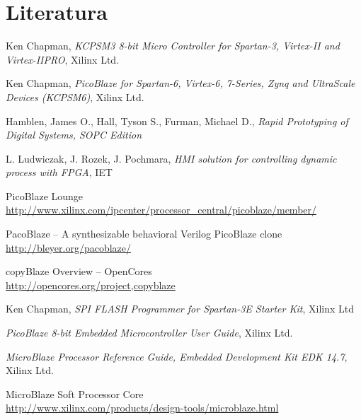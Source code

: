 

\rozdzial

\renewcommand*{\refname}{\vspace*{-1.5cm}}




\section{Literatura} 

\begin{thebibliography}{1}
	
 Ken Chapman,
	\textit{KCPSM3 8-bit Micro Controller for Spartan-3, Virtex-II and \mbox{Virtex-IIPRO}},
	Xilinx Ltd.
	
 Ken Chapman,
	\textit{PicoBlaze for Spartan-6, Virtex-6, 7-Series, Zynq and UltraScale Devices (KCPSM6)},
	Xilinx Ltd.

 Hamblen, James O., Hall, Tyson S., Furman, Michael D.,
	\textit{Rapid Prototyping of Digital Systems, SOPC Edition}


  L. Ludwiczak, J. Rozek, J. Pochmara,
	\textit{HMI solution for controlling dynamic process with FPGA},
	IET

 PicoBlaze Lounge \\
	\url{http://www.xilinx.com/ipcenter/processor\_central/picoblaze/member/}

 PacoBlaze -- A synthesizable behavioral Verilog PicoBlaze clone \\
	\url{http://bleyer.org/pacoblaze/}

 copyBlaze Overview -- OpenCores\\
	\url{http://opencores.org/project,copyblaze}

 Ken Chapman,
	\textit{SPI FLASH Programmer for Spartan-3E Starter Kit},
	Xilinx Ltd

	\textit{PicoBlaze 8-bit Embedded Microcontroller User Guide},
	Xilinx Ltd.
	
	\textit{MicroBlaze Processor Reference Guide, Embedded Development Kit EDK 14.7},
	Xilinx Ltd.
	
 MicroBlaze Soft Processor Core \\
	\url{http://www.xilinx.com/products/design-tools/microblaze.html}


\end{thebibliography}
